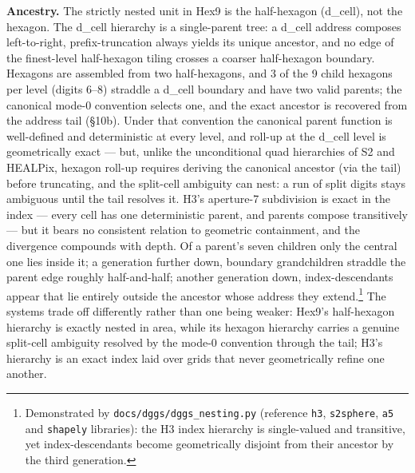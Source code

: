 \documentclass[
  11pt,
  a4paper,
]{article}
\begin{document}
\textbf{Ancestry.} The strictly nested unit in Hex9 is the half-hexagon
(d\_cell), not the hexagon. The d\_cell hierarchy is a single-parent
tree: a d\_cell address composes left-to-right, prefix-truncation always
yields its unique ancestor, and no edge of the finest-level half-hexagon
tiling crosses a coarser half-hexagon boundary. Hexagons are assembled
from two half-hexagons, and 3 of the 9 child hexagons per level (digits
6--8) straddle a d\_cell boundary and have two valid parents; the
canonical mode-0 convention selects one, and the exact ancestor is
recovered from the address tail (§10b). Under that convention the
canonical parent function is well-defined and deterministic at every
level, and roll-up at the d\_cell level is geometrically exact --- but,
unlike the unconditional quad hierarchies of S2 and HEALPix, hexagon
roll-up requires deriving the canonical ancestor (via the tail) before
truncating, and the split-cell ambiguity can nest: a run of split digits
stays ambiguous until the tail resolves it. H3's aperture-7 subdivision
is exact in the index --- every cell has one deterministic parent, and
parents compose transitively --- but it bears no consistent relation to
geometric containment, and the divergence compounds with depth. Of a
parent's seven children only the central one lies inside it; a
generation further down, boundary grandchildren straddle the parent edge
roughly half-and-half; another generation down, index-descendants appear
that lie entirely outside the ancestor whose address they
extend.\footnote{Demonstrated by \texttt{docs/dggs/dggs\_nesting.py}
  (reference \texttt{h3}, \texttt{s2sphere}, \texttt{a5} and
  \texttt{shapely} libraries): the H3 index hierarchy is single-valued
  and transitive, yet index-descendants become geometrically disjoint
  from their ancestor by the third generation.} The systems trade off
differently rather than one being weaker: Hex9's half-hexagon hierarchy
is exactly nested in area, while its hexagon hierarchy carries a genuine
split-cell ambiguity resolved by the mode-0 convention through the tail;
H3's hierarchy is an exact index laid over grids that never
geometrically refine one another.
\end{document}
